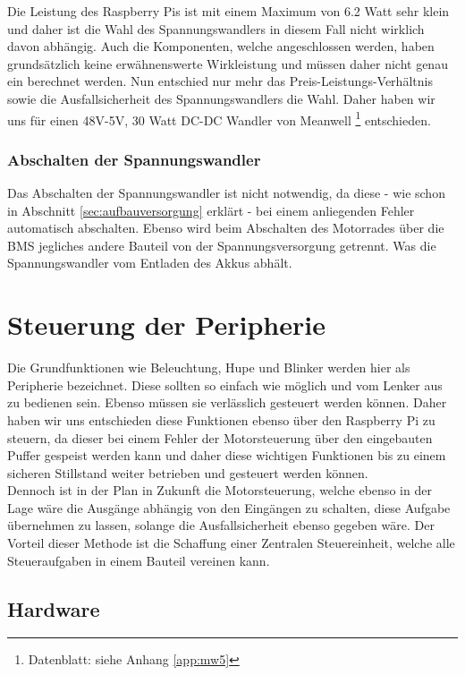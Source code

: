 Die Leistung des Raspberry Pis ist mit einem Maximum von 6.2 Watt sehr klein und daher ist die Wahl des Spannungswandlers in diesem Fall nicht wirklich davon abhängig. Auch die Komponenten, welche angeschlossen werden, haben grundsätzlich keine erwähnenswerte Wirkleistung und müssen daher nicht genau ein berechnet werden. Nun entschied nur mehr das Preis-Leistungs-Verhältnis sowie die Ausfallsicherheit des Spannungswandlers die Wahl. Daher haben wir uns für einen 48V-5V, 30 Watt DC-DC Wandler von Meanwell \footnote{Datenblatt: siehe Anhang \ref{app:mw5}} entschieden.

\subsubsection{Abschalten der Spannungswandler}
Das Abschalten der Spannungswandler ist nicht notwendig, da diese - wie schon in Abschnitt \ref{sec:aufbauversorgung} erklärt - bei einem anliegenden Fehler automatisch abschalten.
Ebenso wird beim Abschalten des Motorrades über die BMS jegliches andere Bauteil von der Spannungsversorgung getrennt. Was die Spannungswandler vom Entladen des Akkus abhält.  

\newpage


\section{Steuerung der Peripherie}

Die Grundfunktionen wie Beleuchtung, Hupe und Blinker werden hier als Peripherie bezeichnet. Diese sollten so einfach wie möglich und vom Lenker aus zu bedienen sein. Ebenso müssen sie verlässlich gesteuert werden können. Daher haben wir uns entschieden diese Funktionen ebenso über den Raspberry Pi zu steuern, da dieser bei einem Fehler der Motorsteuerung über den eingebauten Puffer gespeist werden kann und daher diese wichtigen Funktionen bis zu einem sicheren Stillstand weiter betrieben und gesteuert werden können.\\
Dennoch ist in der Plan in Zukunft die Motorsteuerung, welche ebenso in der Lage wäre die Ausgänge abhängig von den Eingängen zu schalten, diese Aufgabe übernehmen zu lassen, solange die Ausfallsicherheit ebenso gegeben wäre. Der Vorteil dieser Methode ist die Schaffung einer Zentralen Steuereinheit, welche alle Steueraufgaben in einem Bauteil vereinen kann.

\subsection{Hardware}

